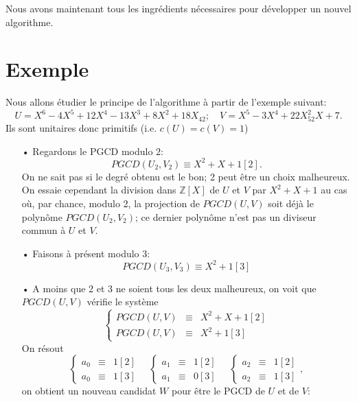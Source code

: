 \documentclass[12pt]{report}
\begin{document}
Nous avons maintenant tous les ingrédients nécessaires pour développer un nouvel algorithme.


\section*{Exemple}

Nous allons étudier le principe de l'algorithme à partir de l'exemple suivant:
$$    U=X^6-4X^5 +12X^4  -13 X^3 +8X^2  +18 X _42; \quad  V= X^5 -3X^4  +22 X^2 _52 X +7  . $$
Ils sont unitaires donc primitifs (i.e. $c(U)=c(V)=1$)



\begin{itemize}
\item[•] Regardons le PGCD modulo $2$: 
$$   PGCD(U_2,V_2) \equiv X^2+X+1 [2]  .    $$
On ne sait pas si le degré obtenu est le bon; 2 peut être un choix malheureux. On essaie cependant la division dans $\mathbb{Z}[X]$ de $U$ et $V$ par $X^2+X+1$ au cas où, par chance, modulo 2, la projection de $PGCD(U,V)$ soit déjà le polynôme $PGCD(U_2,V_2)$; ce dernier polynôme n'est pas un diviseur commun à $U$ et $V$.
\item[•] Faisons à présent modulo $3$:
$$    PGCD(U_3,V_3) \equiv X^2+1 [3]      $$
\item[•] A moins que 2 et 3 ne soient tous les deux malheureux, on voit que $PGCD(U,V)$ vérifie le système
$$      \left \{     \begin{array}{ccc}
PGCD(U,V) & \equiv  & X^2 +X+1 [2] \\
PGCD(U,V) & \equiv & X^2+1 [3]
\end{array}     \right.     $$
On résout
\begin{equation*}      \left \{     \begin{array}{ccc}
a_0 & \equiv  & 1 [2] \\
a_0 & \equiv &1 [3]
\end{array}     \right.  \quad         \left \{     \begin{array}{ccc}
a_1 & \equiv  & 1 [2] \\
a_1 & \equiv &0 [3]
\end{array}     \right.    \quad
    \left \{     \begin{array}{ccc}
a_2 & \equiv  & 1 [2] \\
a_2 & \equiv &1 [3]
\end{array}     \right. ,  
  \end{equation*}
on obtient un nouveau candidat $W$ pour être le PGCD de $U$ et de $V$:

\end{itemize}
\end{document}
